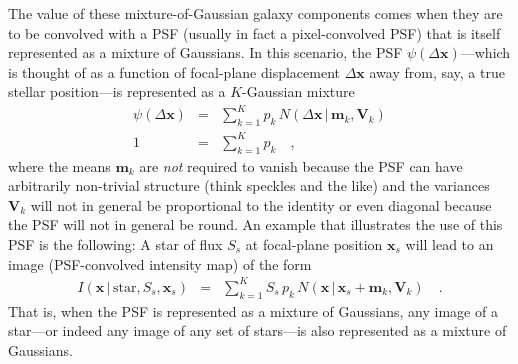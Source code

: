 \documentclass[12pt,pdftex,preprint]{aastex}
\newcommand{\tmatrix}[1]{\boldsymbol{#1}}
\newcommand{\tvector}[1]{\boldsymbol{#1}}
\newcommand{\pos}{\tvector{x}}
\newcommand{\mean}{\tvector{m}}
\newcommand{\var}{\tmatrix{V}}
\newcommand{\normal}{N}
\newcommand{\given}{\,|\,}
\renewcommand{\star}{\mathrm{star}}
\begin{document}
The value of these mixture-of-Gaussian galaxy components comes when
they are to be convolved with a PSF (usually in fact a pixel-convolved
PSF) that is itself represented as a mixture of Gaussians.  In this
scenario, the PSF $\psi(\Delta\pos)$---which is thought of as a
function of focal-plane displacement $\Delta\pos$ away from, say, a
true stellar position---is represented as a $K$-Gaussian mixture
\begin{eqnarray}\displaystyle
\psi(\Delta\pos) &=& \sum_{k=1}^K p_k\,\normal(\Delta\pos\given\mean_k,\var_k)
\\
1 &=& \sum_{k=1}^K p_k
\quad ,
\end{eqnarray}
where the means $\mean_k$ are \emph{not} required to vanish because
the PSF can have arbitrarily non-trivial structure (think speckles and
the like) and the variances $\var_k$ will not in general be
proportional to the identity or even diagonal because the PSF will not
in general be round.  An example that illustrates the use of this PSF
is the following: A star of flux $S_s$ at focal-plane position
$\pos_s$ will lead to an image (PSF-convolved intensity map) of the
form
\begin{eqnarray}\displaystyle
I(\pos\given\star,S_s,\pos_s) &=& \sum_{k=1}^K S_s\,p_k\,\normal(\pos\given\pos_s+\mean_k,\var_k)
\quad .
\end{eqnarray}
That is, when the PSF is represented as a mixture of Gaussians, any
image of a star---or indeed any image of any set of stars---is also
represented as a mixture of Gaussians.
\end{document}
